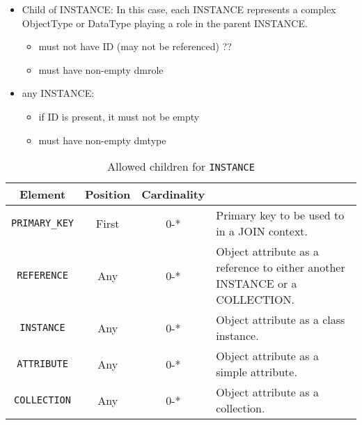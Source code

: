 \begin{itemize}
\begin{itemize}
     \item Child of INSTANCE: In this case, each INSTANCE represents 
           a complex ObjectType or DataType playing a role in the parent
           INSTANCE.     
           \begin{itemize}
             \item must not have ID (may not be referenced) ??
             \item must have non-empty dmrole
           \end{itemize}
           
     \item any INSTANCE:     
           \begin{itemize}
             \item if ID is present, it must not be empty
             \item must have non-empty dmtype
           \end{itemize}
    \end{itemize}  
  
\end{itemize}  

 
\begin{table}[!htbp]
\small
\centering
\begin{tabulary}{\linewidth}{|c |c |c|J|}
    \hline 
        \textbf{Element} &
        \textbf{Position} &
        \textbf{Cardinality} &
        \\
    \hline      \hline  
        \texttt{PRIMARY\_KEY}  &        
        First &           
        0-* &
        Primary key to be used to in a JOIN context.\\
    \hline    
        \texttt{REFERENCE}  &        
        Any &           
        0-* &
         Object attribute as a reference to either another INSTANCE or a COLLECTION.\\
    \hline    
        \texttt{INSTANCE} &           
        Any &           
        0-* &
         Object attribute as a class instance. \\
    \hline    
        \texttt{ATTRIBUTE} &           
        Any &           
        0-* &
       Object attribute as a simple attribute. \\
    \hline    
        \texttt{COLLECTION} &           
        Any &           
        0-* &
         Object attribute  as a collection.\\
    \hline 
\end{tabulary}
     \caption{Allowed children for \texttt{INSTANCE}} 
     \label{tbl:instance-chilren}
 \end{table}
 
